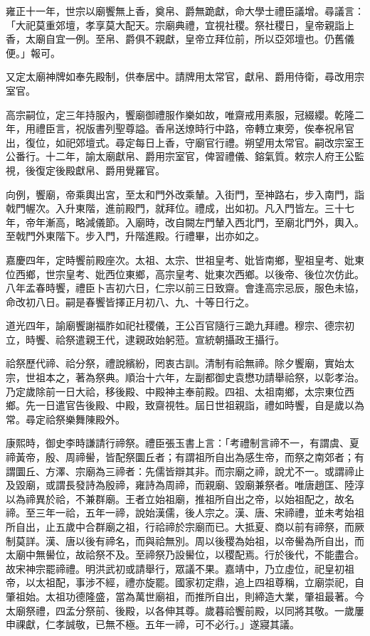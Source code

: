 \begin{pinyinscope}
雍正十一年，世宗以廟饗無上香，奠帛、爵無跪獻，命大學士禮臣議增。尋議言：「大祀莫重郊壇，孝享莫大配天。宗廟典禮，宜視社稷。祭社稷日，皇帝親詣上香，太廟自宜一例。至帛、爵俱不親獻，皇帝立拜位前，所以亞郊壇也。仍舊儀便。」報可。

又定太廟神牌如奉先殿制，供奉居中。請牌用太常官，獻帛、爵用侍衛，尋改用宗室官。

高宗嗣位，定三年持服內，饗廟御禮服作樂如故，唯齋戒用素服，冠綴纓。乾隆二年，用禮臣言，祝版書列聖尊謚。香帛送燎時行中路，帝轉立東旁，俟奉祝帛官出，復位，如祀郊壇式。尋定每日上香，守廟官行禮。朔望用太常官。嗣改宗室王公番行。十二年，諭太廟獻帛、爵用宗室官，俾習禮儀、鎔氣質。敕宗人府王公監視，後復定後殿獻帛、爵用覺羅官。

向例，饗廟，帝乘輿出宮，至太和門外改乘輦。入街門，至神路右，步入南門，詣戟門幄次。入升東階，進前殿門，就拜位。禮成，出如初。凡入門皆左。三十七年，帝年漸高，略減儀節。入廟時，改自闕左門輦入西北門，至廟北門外，輿入。至戟門外東階下。步入門，升階進殿。行禮畢，出亦如之。

嘉慶四年，定時饗前殿座次。太祖、太宗、世祖皇考、妣皆南鄉，聖祖皇考、妣東位西鄉，世宗皇考、妣西位東鄉，高宗皇考、妣東次西鄉。以後帝、後位次仿此。八年孟春時饗，禮臣卜吉初六日，仁宗以前三日致齋。會逢高宗忌辰，服色未協，命改初八日。嗣是春饗皆擇正月初八、九、十等日行之。

道光四年，諭廟饗謝福胙如祀社稷儀，王公百官隨行三跪九拜禮。穆宗、德宗初立，時饗、祫祭遣親王代，逮親政始躬蒞。宣統朝攝政王攝行。

祫祭歷代禘、祫分祭，禮說繽紛，罔衷古訓。清制有祫無禘。除夕饗廟，實始太宗，世祖本之，著為祭典。順治十六年，左副都御史袁懋功請舉祫祭，以彰孝治。乃定歲除前一日大祫，移後殿、中殿神主奉前殿。四祖、太祖南鄉，太宗東位西鄉。先一日遣官告後殿、中殿，致齋視牲。屆日世祖親詣，禮如時饗，自是歲以為常。尋定祫祭樂舞陳殿外。

康熙時，御史李時謙請行禘祭。禮臣張玉書上言：「考禮制言禘不一，有謂虞、夏禘黃帝，殷、周禘嚳，皆配祭圜丘者；有謂祖所自出為感生帝，而祭之南郊者；有謂圜丘、方澤、宗廟為三禘者：先儒皆辯其非。而宗廟之禘，說尤不一。或謂禘止及毀廟，或謂長發詩為殷禘，雍詩為周禘，而親廟、毀廟兼祭者。唯唐趙匡、陸淳以為禘異於祫，不兼群廟。王者立始祖廟，推祖所自出之帝，以始祖配之，故名禘。至三年一祫，五年一禘，說始漢儒，後人宗之。漢、唐、宋禘禮，並未考始祖所自出，止五歲中合群廟之祖，行祫禘於宗廟而已。大抵夏、商以前有禘祭，而厥制莫詳。漢、唐以後有禘名，而與祫無別。周以後稷為始祖，以帝嚳為所自出，而太廟中無嚳位，故祫祭不及。至禘祭乃設嚳位，以稷配焉。行於後代，不能盡合。故宋神宗罷禘禮。明洪武初或請舉行，眾議不果。嘉靖中，乃立虛位，祀皇初祖帝，以太祖配，事涉不經，禮亦旋罷。國家初定鼎，追上四祖尊稱，立廟崇祀，自肇祖始。太祖功德隆盛，當為萬世廟祖，而推所自出，則締造大業，肇祖最著。今太廟祭禮，四孟分祭前、後殿，以各伸其尊。歲暮祫饗前殿，以同將其敬。一歲屢申祼獻，仁孝誠敬，已無不極。五年一禘，可不必行。」遂寢其議。


\end{pinyinscope}
